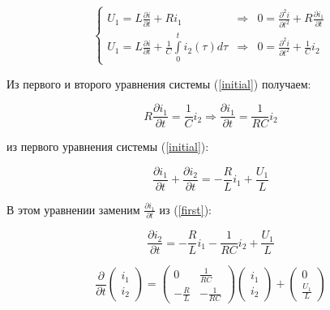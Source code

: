 \documentclass[a4paper,12pt]{article}
\begin{document}
\begin{equation}
\left\{
\begin{array}{lll}
U_1 = L\frac{\partial i}{\partial t} + R i_1 & \Rightarrow & 0 = \frac{\partial^2 i}{\partial t^2} + R \frac{\partial i_1}{\partial t} \\
	U_1 = L\frac{\partial i}{\partial t} + \frac{1}{C}\int\limits_0^t i_2(\tau) d\tau & \Rightarrow & 0 = \frac{\partial^2 i}{\partial t^2} + \frac{1}{C} i_2
\end{array}
\right.
\label{initial}
\end{equation}

Из первого и второго уравнения системы (\ref{initial}) получаем:

\begin{equation}
R\frac{\partial i_1}{\partial t} = \frac{1}{C} i_2 \Rightarrow \frac{\partial i_1}{\partial t} = \frac{1}{RC} i_2 
\label{first}
\end{equation}

из первого уравнения системы (\ref{initial}):

$$
\frac{\partial i_1}{\partial t} + \frac{\partial i_2}{\partial t} = -\frac{R}{L} i_1 + \frac{U_1}{L} 
$$










В этом уравнении заменим $\frac{\partial i_1}{\partial t}$ из (\ref{first}):

$$
\frac{\partial i_2}{\partial t} = - \frac{R}{L} i_1 - \frac{1}{RC} i_2 + \frac{U_1}{L}
$$

\begin{equation}
\frac{\partial}{\partial t}\!\left(\begin{array}{c}i_1\\[1.5mm]i_2\end{array}\right) =
	\left(\begin{array}{cc}0&\frac{1}{RC}\\[1.5mm] -\frac{R}{L}&-\frac{1}{RC}\end{array}\right)
		\left(\begin{array}{c}i_1\\[1.5mm]i_2\end{array}\right)
		+
	\left(\begin{array}{c}0\\[1.5mm]\frac{U_1}{L}\end{array}\right)
\end{equation}
\end{document}
